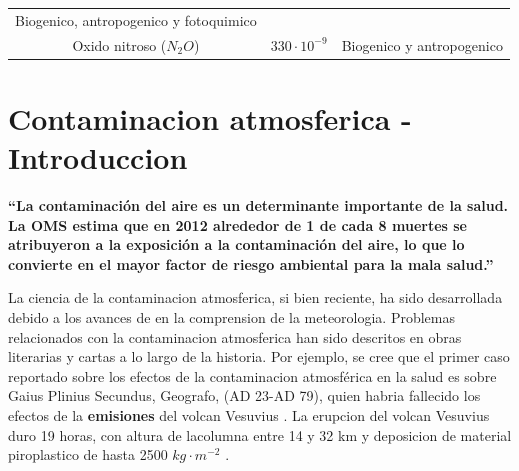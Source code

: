 \documentclass[]{book}
\begin{document}
\begin{longtable}[]{@{}ccc@{}}
\begin{minipage}[t]{0.28\columnwidth}
Biogenico, antropogenico y fotoquimico\strut
\end{minipage}\tabularnewline
\begin{minipage}[t]{0.15\columnwidth}\centering
Oxido nitroso (\(N_2O\))\strut
\end{minipage} & \begin{minipage}[t]{0.48\columnwidth}\centering
\(330 \cdot10^{-9}\)\strut
\end{minipage} & \begin{minipage}[t]{0.28\columnwidth}\centering
Biogenico y antropogenico\strut
\end{minipage}\tabularnewline
\bottomrule
\end{longtable}

\hypertarget{contaminacion-atmosferica---introduccion}{%
\section{Contaminacion atmosferica - Introduccion}\label{contaminacion-atmosferica---introduccion}}

\textbf{``La contaminación del aire es un determinante importante de la salud. La OMS estima que en 2012 alrededor de 1 de cada 8 muertes se atribuyeron a la exposición a la contaminación del aire, lo que lo convierte en el mayor factor de riesgo ambiental para la mala salud.''}\citep{oms}

La ciencia de la contaminacion atmosferica, si bien reciente, ha sido desarrollada debido a los avances de en la comprension de la meteorologia. Problemas relacionados con la contaminacion atmosferica han sido descritos en obras literarias y cartas a lo largo de la historia. Por ejemplo, se cree que el primer caso reportado sobre los efectos de la contaminacion atmosférica en la salud es sobre Gaius Plinius Secundus, Geografo, (AD 23-AD 79), quien habria fallecido los efectos de la \textbf{emisiones} del volcan Vesuvius \citep{art, vis}. La erupcion del volcan Vesuvius duro 19 horas, con altura de lacolumna entre 14 y 32 km y deposicion de material piroplastico de hasta 2500 \(kg \cdot m^{-2}\) \citep{macedonio1988numerical}.
\end{document}
